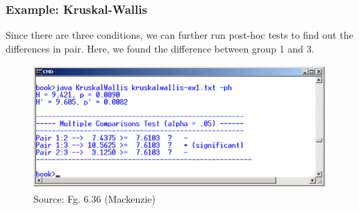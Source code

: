 \documentclass{beamer}
\begin{document}
\begin{frame}
	\frametitle{Example: Kruskal-Wallis} 
	Since there are three conditions, we can further run post-hoc tests to find out the differences in pair.  Here, we found the difference between group 1 and 3.
	\begin{figure}
		\includegraphics[width=0.6\linewidth]{6-36}
		\caption{Source: Fg. 6.36 (Mackenzie)}
	\end{figure}
\end{frame}
\end{document}
